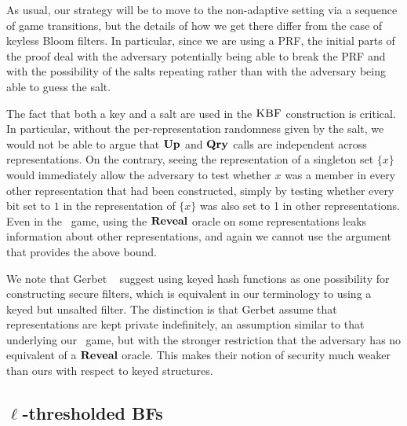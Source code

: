 As usual, our strategy will be to move to the non-adaptive setting via a
sequence of game transitions, but the details of how we get there differ from
the case of keyless Bloom filters.  In particular, since we are using a PRF, the
initial parts of the proof deal with the adversary potentially being able to
break the PRF and with the possibility of the salts repeating rather than with
the adversary being able to guess the salt.



The fact that both a key and a salt are used in the $\textnormal{\textsc{KBF}}$ construction is
critical. In particular, without the per-representation randomness given by the
salt, we would not be able to argue that $\textup{\textbf{Up}}\hspace{0.5pt}$ and $\textup{\textbf{Qry}}\hspace{0.5pt}$ calls are
independent across representations. On the contrary, seeing the representation
of a singleton set $\{x\}$ would immediately allow the adversary to test whether
$x$ was a member in every other representation that had been constructed, simply
by testing whether every bit set to $1$ in the representation of $\{x\}$ was also
set to 1 in other representations. Even in the \erreps\ game, using the $\mathbf{Reveal}$
oracle on some representations leaks information about other representations,
and again we cannot use the argument that provides the above bound.

We note that Gerbet \etal~\cite{gerbet2015power} suggest using keyed
hash functions as one possibility for constructing secure filters, which is
equivalent in our terminology to using a keyed but unsalted filter.
%
The distinction is that Gerbet \etal assume that representations are kept
private indefinitely, an assumption similar to that underlying our \erreps\
game, but with the stronger restriction that the adversary has no equivalent of
a $\mathbf{Reveal}$ oracle. This makes their notion of security much weaker than ours with
respect to keyed structures.

\subsection{$\ell$-thresholded BFs}\label{sec:bf-thresh}

